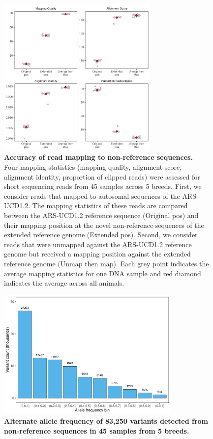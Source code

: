 \documentclass[../main.tex]{subfiles}
\begin{document}
\begin{flushleft}
\begin{figure}[!htb]
    \centering
    \includegraphics[width=0.7\textwidth]{paper3/supplement/sp413.pdf}
    \caption[Accuracy of read mapping to non-reference sequences]{\textbf{Accuracy of read mapping to non-reference sequences.} \\
    \small{Four mapping statistics (mapping quality, alignment score, alignment identity, proportion of clipped reads) were assessed for short sequencing reads from 45 samples across 5 breeds. First, we consider reads that mapped to autosomal sequences of the ARS-UCD1.2. The mapping statistics of these reads are compared between the ARS-UCD1.2 reference sequence (Original pos) and their mapping position at the novel non-reference sequences of the extended reference genome (Extended pos). Second, we consider reads that were unmapped against the ARS-UCD1.2 reference genome but received a mapping position against the extended reference genome (Unmap then map). Each grey point indicates the average mapping statistics for one DNA sample and red diamond indicates the average across all animals. }}
    \label{sup_fig:s413}
\end{figure}

\newpage

\begin{figure}[!htb]
    \centering
    \includegraphics[width=0.8\textwidth]{paper3/supplement/sp414.pdf}
    \caption[Distribuion of variants in non-reference sequences]{\textbf{Alternate allele frequency of 83,250 variants detected from non-reference sequences in 45 samples from 5 breeds.}}
    \label{sup_fig:s414}
\end{figure}


\end{flushleft}
\end{document}
